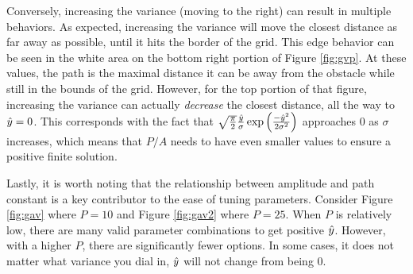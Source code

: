 Conversely, increasing the variance (moving to the right) can result in multiple behaviors. As expected, increasing the variance will move the closest distance as far away as possible, until it hits the border of the grid. This edge behavior can be seen in the white area on the bottom right portion of Figure \ref{fig:gvp}. At these values, the path is the maximal distance it can be away from the obstacle while still in the bounds of the grid. However, for the top portion of that figure, increasing the variance can actually \emph{decrease} the closest distance, all the way to $\hat{y}=0$. This corresponds with the fact that $ \sqrt{\frac{\pi}{2}} \frac{\hat{y}}{\sigma} \exp\Big( \frac{-\hat{y}^2}{2\sigma^2} \Big) $ approaches 0 as $\sigma$ increases, which means that $P/A$ needs to have even smaller values to ensure a positive finite solution. 

Lastly, it is worth noting that the relationship between amplitude and path constant is a key contributor to the ease of tuning parameters. Consider Figure \ref{fig:gav} where $P=10$ and Figure \ref{fig:gav2} where $P=25$. When $P$ is relatively low, there are many valid parameter combinations to get positive $\hat{y}$. However, with a higher $P$, there are significantly fewer options. In some cases, it does not matter what variance you dial in, $\hat{y}$ will not change from being 0. 

